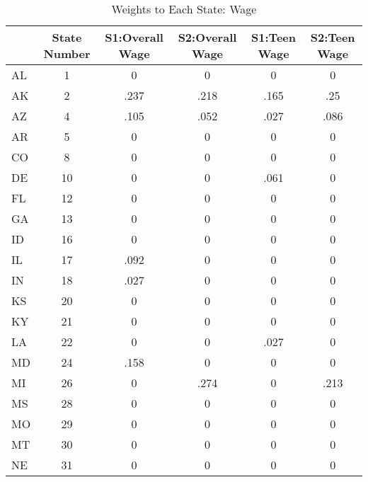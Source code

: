 \begin{table}[htbp]\centering
\caption{Weights to Each State: Wage}
\begin{tabular}{l*{5}{c}}
\toprule
            &State Number&S1:Overall Wage&S2:Overall Wage&S1:Teen Wage&S2:Teen Wage\\
\midrule
AL          &           1&           0&           0&           0&           0\\
AK          &           2&        .237&        .218&        .165&         .25\\
AZ          &           4&        .105&        .052&        .027&        .086\\
AR          &           5&           0&           0&           0&           0\\
CO          &           8&           0&           0&           0&           0\\
DE          &          10&           0&           0&        .061&           0\\
FL          &          12&           0&           0&           0&           0\\
GA          &          13&           0&           0&           0&           0\\
ID          &          16&           0&           0&           0&           0\\
IL          &          17&        .092&           0&           0&           0\\
IN          &          18&        .027&           0&           0&           0\\
KS          &          20&           0&           0&           0&           0\\
KY          &          21&           0&           0&           0&           0\\
LA          &          22&           0&           0&        .027&           0\\
MD          &          24&        .158&           0&           0&           0\\
MI          &          26&           0&        .274&           0&        .213\\
MS          &          28&           0&           0&           0&           0\\
MO          &          29&           0&           0&           0&           0\\
MT          &          30&           0&           0&           0&           0\\
NE          &          31&           0&           0&           0&           0\\

\end{tabular}
\end{table}

